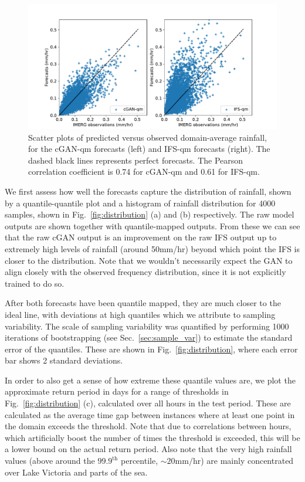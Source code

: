 \documentclass{article}
\begin{document}
\begin{figure}
\centering

    \centering
     \includegraphics[width=\textwidth]{images/scatter_mean_final-nologs_217600.pdf}
     \caption{Scatter plots of predicted versus observed domain-average rainfall, for the cGAN-qm forecasts (left) and IFS-qm forecasts (right). The dashed black lines represents perfect forecasts. The Pearson correlation coefficient is 0.74 for cGAN-qm and 0.61 for IFS-qm.}
     \label{fig:bias}
\end{figure}

 We first assess how well the forecasts capture the distribution of rainfall, shown by a quantile-quantile plot and a histogram of rainfall distribution for 4000 samples, shown in Fig.~\ref{fig:distribution} (a) and (b) respectively. The raw model outputs are shown together with quantile-mapped outputs. From these we can see that the raw cGAN output is an improvement on the raw IFS output up to extremely high levels of rainfall (around 50mm/hr) beyond which point the IFS is closer to the distribution. Note that we wouldn't necessarily expect the GAN to align closely with the observed frequency distribution, since it is not explicitly trained to do so.

After both forecasts have been quantile mapped, they are much closer to the ideal line, with deviations at high quantiles which we attribute to sampling variability. The scale of sampling variability was quantified by performing 1000 iterations of bootstrapping (see Sec.~\ref{sec:sample_var}) to estimate the standard error of the quantiles. These are shown in Fig.~\ref{fig:distribution}, where each error bar shows 2 standard deviations.


In order to also get a sense of how extreme these quantile values are, we plot the approximate return period in days for a range of thresholds in Fig.~\ref{fig:distribution} (c), calculated over all hours in the test period. These are calculated as the average time gap between instances where at least one point in the domain exceeds the threshold. Note that due to correlations between hours, which artificially boost the number of times the threshold is exceeded, this will be a lower bound on the actual return period. Also note that the very high rainfall values (above around the $99.9^{\text{th}}$ percentile, $\sim20\text{mm/hr}$) are mainly concentrated over Lake Victoria and parts of the sea. 
\end{document}
